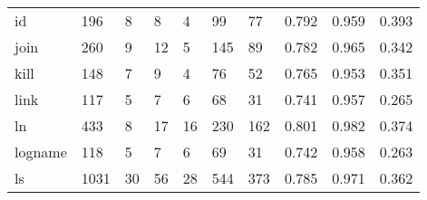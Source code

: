 \begin{longtable}{lp{2.0cm}p{2.0cm}p{2.0cm}p{2.0cm}p{2.0cm}p{2.0cm}p{2.0cm}p{2.0cm}p{2.0cm}}
id        &                    196 &                                  8 &                                 8 &                                4 &                                99 &                              77 &                                   0.792 &                                  0.959 &                                0.393 \\
join      &                    260 &                                  9 &                                12 &                                5 &                               145 &                              89 &                                   0.782 &                                  0.965 &                                0.342 \\
kill      &                    148 &                                  7 &                                 9 &                                4 &                                76 &                              52 &                                   0.765 &                                  0.953 &                                0.351 \\
link      &                    117 &                                  5 &                                 7 &                                6 &                                68 &                              31 &                                   0.741 &                                  0.957 &                                0.265 \\
ln        &                    433 &                                  8 &                                17 &                               16 &                               230 &                             162 &                                   0.801 &                                  0.982 &                                0.374 \\
logname   &                    118 &                                  5 &                                 7 &                                6 &                                69 &                              31 &                                   0.742 &                                  0.958 &                                0.263 \\
ls        &                   1031 &                                 30 &                                56 &                               28 &                               544 &                             373 &                                   0.785 &                                  0.971 &                                0.362 \\

\end{longtable}
